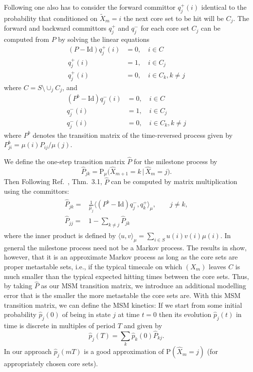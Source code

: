 \documentclass[aps, pre, preprint,unsortedaddress,a4paper,onecolumn]{revtex4}
\newcommand{\vect}[1]{#1}
\newcommand{\fwd}[0]{+}
\newcommand{\bwd}[0]{-}
\newcommand{\id}{\mathrm{Id}}
\newcommand{\prob}{\textrm{P}}
\begin{document}
Following \cite{discreteTPT} one also has to consider the forward committor $q^\fwd_j(i)$ identical to the probability  that conditioned on $\tilde X_m=i$ the next core set to be hit will be $C_j$.
The forward and backward committors $q^\fwd_j$ and $q^\bwd_j$  for each core set $C_j$ can be computed from $P$ by solving the linear equations \cite{discreteTPT}
\begin{align}
(P-\id) q^\fwd_j(i) & =  0, \quad i\in C\label{qfwd}\\
q^\fwd_j(i) & =  1,\quad i\in C_j\nonumber\\
q^\fwd_j(i) & =  0,\quad i\in C_k,k\not=j\nonumber
\end{align}
where $C=S\setminus\cup_j C_j$, and
\begin{align}
(P^b-\id) q^\bwd_j(i) & =  0, \quad i\in C\label{qbwd}\\
q^\bwd_j(i) & =  1,\quad i\in C_j\nonumber \\
q^\bwd_j(i) & =  0,\quad i\in C_k,k\not=j\nonumber
\end{align}
where $P^b$ denotes the transition matrix of the time-reversed process
given by $P^b_{ji}=\mu(i) P_{ij}/\mu(j)$.

We define the one-step transition matrix $\hat{\vect P}$ for the milestone process by
\begin{equation}\label{hatP_prob}
\hat{\vect P}_{jk}=\prob_\mu\Big(\hat{X}_{m+1}=k\,\vert\, \hat{X}_m=j\Big).
\end{equation}
Then Following
Ref.~\cite{djurdjevac2010markov}, Thm.~3.1, 
$\hat{\vect P}$ can be computed by matrix multiplication using the committors:
  \begin{align}
    \label{eq:msm-tmatrix-00}
    \begin{split}      
    \hat{\vect P}_{jk}
    = &
    \frac{1}{\hat{\mu}_j}
    \langle (\vect P^b - \id) q^\bwd_j,q^\fwd_k \rangle_\mu,\qquad j\not= k, \\    %
    \hat{\vect P}_{jj}
    =&
    1-\sum_{k\not=j} \hat{\vect P}_{jk}
    \end{split}
  \end{align}
where the inner product is defined by
$\langle u,v \rangle_\mu=\sum_{i\in S} u(i) v(i) \mu(i)$. 
In general the milestone process need not be a Markov process. The results in \cite{A19-31,sarich2014utilizing} show, however, that it is an approximate Markov process as long as the core sets are proper metastable sets, i.e., if the typical timecale on which $(X_m)$ leaves $C$ is much smaller than the typical expected hitting times between the core sets.
Thus, by taking $\hat{P}$ as our MSM transition matrix, we introduce an additional modelling error that is the smaller the more metastable the core sets are.
With this MSM transition matrix, we can define the MSM kinetics:
If we start from some initial probability $\hat{p}_j(0)$ of being in state $j$ at time $t=0$ then its evolution $\hat{p}_j(t)$ in time is discrete in multiples of period $T$ and given by
\begin{equation}\label{eq:num-29}
\hat{p}_j(T)=\sum_k \hat{p}_k(0)\hat{\vect P}_{kj}.
\end{equation}
In our approach $\hat p_j(mT)$ is a good approximation of $\prob(\hat{X}_m=j)$ (for appropriately chosen core sets).
\end{document}
